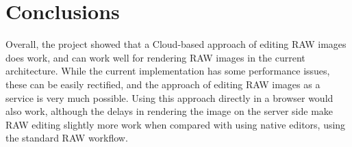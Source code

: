 \documentclass[10pt,a4paper]{article}
\begin{document}
\section{Conclusions}
Overall, the project showed that a Cloud-based approach of editing RAW images does work, and can work well for rendering RAW images in the current architecture.
While the current implementation has some performance issues, these can be easily rectified, and the approach of editing RAW images as a service is very much possible.
Using this approach directly in a browser would also work, although the delays in rendering the image on the server side make RAW editing slightly more work when compared with
using native editors, using the standard RAW workflow.



\end{document}
